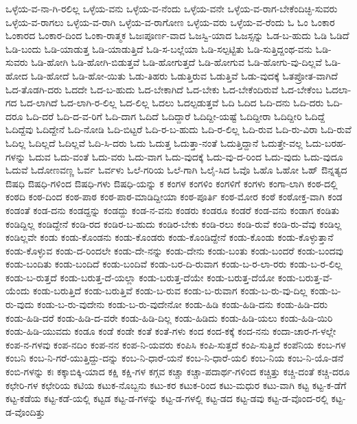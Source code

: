 {ಒಳ್ಳೆಯ-ವ-ನಾ-ಗಿ-ರಲಿಲ್ಲ
ಒಳ್ಳೆಯ-ವನು
ಒಳ್ಳೆಯ-ವ-ನೆಂದು
ಒಳ್ಳೆಯ-ವನೇ
ಒಳ್ಳೆಯ-ವ-ರಾಗ-ಬೇಕೆಂದಿಚ್ಛಿ-ಸುವರು
ಒಳ್ಳೆಯ-ವ-ರಾಗಲು
ಒಳ್ಳೆಯ-ವ-ರಾಗಿ
ಒಳ್ಳೆಯ-ವ-ರಾಗೋಣ
ಒಳ್ಳೆಯ-ವರು
ಒಳ್ಳೆಯ-ವ-ರೆಂದು
ಓ
ಓಂ
ಓಂಕಾರ
ಓಂಕಾರದ
ಓಂಕಾರ-ದಿಂದ
ಓಂಕಾ-ರಾತ್ಮಕ
ಓಜಃಪೂರ್ಣ-ವಾದ
ಓಜಸ್ವಿ-ಯಾದ
ಓಜಸ್ಸನ್ನು
ಓಡ-ಬ-ಹುದು
ಓಡಿ
ಓಡಿದೆ
ಓಡಿ-ಬಂದು
ಓಡಿ-ಯಾಡುತ್ತ
ಓಡಿ-ಯಾಡುತ್ತಿದೆ
ಓಡಿ-ಸ-ಬಲ್ಲೆಯಾ
ಓಡಿ-ಸಲ್ಪಟ್ಟಿತು
ಓಡಿ-ಸುತ್ತಿದ್ದಂಥ-ವನು
ಓಡಿ-ಸುವರು
ಓಡಿ-ಹೋಗಿ
ಓಡಿ-ಹೋಗಿ-ಬಿಡುತ್ತವೆ
ಓಡಿ-ಹೋಗುತ್ತದೆ
ಓಡಿ-ಹೋಗುವ
ಓಡಿ-ಹೋಗು-ವು-ದಿಲ್ಲವೆ
ಓಡಿ-ಹೋದ
ಓಡಿ-ಹೋದೆ
ಓಡಿ-ಹೋ-ಯಿತು
ಓಡು-ತಿಹರು
ಓಡುತ್ತಿರುವ
ಓಡುತ್ತಿವೆ
ಓಡು-ವುದಕ್ಕೆ
ಓತಪ್ರೋತ-ವಾಗಿದೆ
ಓದ-ತೊಡಗಿ-ದರು
ಓದದೇ
ಓದ-ಬ-ಹುದು
ಓದ-ಬೇಕಾಗಿದೆ
ಓದ-ಬೇಕು
ಓದ-ಬೇಕೆಂದಿರುವೆ
ಓದ-ಬೇಕೆಂಬ
ಓದಲಾ-ಗದ
ಓದ-ಲಾಗಿದೆ
ಓದ-ಲಾಗಿ-ರ-ಲಿಲ್ಲ
ಓದ-ಲಿಲ್ಲ
ಓದಲು
ಓದಲ್ಪಡುತ್ತವೆ
ಓದಿ
ಓದಿದ
ಓದಿ-ದನು
ಓದಿ-ದರು
ಓದಿ-ದರೂ
ಓದಿ-ದರೆ
ಓದಿ-ದ-ವ-ರಿಗೆ
ಓದಿ-ದಾಗ
ಓದಿದೆ
ಓದಿದ್ದಾರೆ
ಓದಿದ್ದೀ-ಯಷ್ಟೆ
ಓದಿದ್ದೀರಾ
ಓದಿದ್ದೀರಿ
ಓದಿದ್ದೆ
ಓದಿದ್ದೆವು
ಓದಿದ್ದೇನೆ
ಓದಿ-ನೋಡಿ
ಓದಿ-ಬಿಟ್ಟರೆ
ಓದಿ-ರ-ಬ-ಹುದು
ಓದಿ-ರ-ಲಿಲ್ಲ
ಓದಿ-ರುವ
ಓದಿ-ರು-ವಿರಾ
ಓದಿ-ರುವೆ
ಓದಿಲ್ಲ
ಓದಿಲ್ಲದೆ
ಓದಿಲ್ಲವೆ
ಓದಿ-ಸಿ-ದರು
ಓದು
ಓದುತ್ತ
ಓದುತ್ತಾ-ನಂತೆ
ಓದುತ್ತಿದ್ದಾನೆ
ಓದುತ್ತೇ-ವಲ್ಲ
ಓದು-ಬರಹ-ಗಳನ್ನು
ಓದುವ
ಓದು-ವಂತೆ
ಓದು-ವರು
ಓದು-ವಾಗ
ಓದು-ವುದಕ್ಕೆ
ಓದು-ವು-ದ-ರಿಂದ
ಓದು-ವುದು
ಓದು-ವುದೂ
ಓದುವೆ
ಓದೋಣವಣ್ಣ
ಓರ್ವ
ಓರ್ವಳು
ಓಲೆ-ಗರಿಯ
ಓಲೆ-ಗಾಗಿ
ಓಲೈ-ಸಿದ
ಓವೊ
ಓಹೊ
ಓಹೋ
ಓಹ್
ಔನ್ನತ್ಯದ
ಔಷಧಿ
ಔಷಧಿ-ಗಳಿಂದ
ಔಷಧಿ-ಗಳು
ಔಷಧಿ-ಯನ್ನು
ಕ
ಕಂಗಳ
ಕಂಗಳಿಂ
ಕಂಗಳಿಗೆ
ಕಂಗಳು
ಕಂಗಾ-ಲಾಗಿ
ಕಂಠ-ದಲ್ಲಿ
ಕಂಠದಿ
ಕಂಠ-ದಿಂದ
ಕಂಠ-ಪಾಠ
ಕಂಠ-ಪಾಠ-ಮಾಡಿದ್ದೀಯಾ
ಕಂಠ-ಪೂರ್ತಿ
ಕಂಠ-ಮೋರ
ಕಂಠೆ
ಕಂಠೋಕ್ತ-ವಾಗಿ
ಕಂಡ
ಕಂಡಂತೆ
ಕಂಡ-ದನು
ಕಂಡದ್ದನ್ನು
ಕಂಡದ್ದು
ಕಂಡ-ನ-ವನು
ಕಂಡರು
ಕಂಡರೂ
ಕಂಡರೆ
ಕಂಡ-ವನು
ಕಂಡಾಗ
ಕಂಡಿತು
ಕಂಡಿದ್ದಿಲ್ಲ
ಕಂಡಿದ್ದೇನೆ
ಕಂಡಿ-ರದ
ಕಂಡಿರ-ಬ-ಹುದು
ಕಂಡಿರ-ಬೇಕು
ಕಂಡಿ-ರಲು
ಕಂಡಿ-ರುವೆ
ಕಂಡಿ-ರು-ವೆವು
ಕಂಡಿಲ್ಲ
ಕಂಡಿಲ್ಲವೇ
ಕಂಡು
ಕಂಡು-ಕೊಂಡನು
ಕಂಡು-ಕೊಂಡರು
ಕಂಡು-ಕೊಂಡಿದ್ದೇನೆ
ಕಂಡು-ಕೊಂಡು
ಕಂಡು-ಕೊಳ್ಳುತ್ತಾನೆ
ಕಂಡು-ಕೊಳ್ಳುವ
ಕಂಡು-ದ-ರಿಂದಲೇ
ಕಂಡು-ದೇ-ನನ್ನು
ಕಂಡು-ದೇನು
ಕಂಡು-ಬಂತು
ಕಂಡು-ಬಂದರೆ
ಕಂಡು-ಬಂದವು
ಕಂಡು-ಬಂದಿತು
ಕಂಡು-ಬಂದಿದೆ
ಕಂಡು-ಬಂದಿವೆ
ಕಂಡು-ಬರ-ದಿ-ರುವಾಗ
ಕಂಡು-ಬ-ರ-ಲಾ-ರರು
ಕಂಡು-ಬ-ರ-ಲಿಲ್ಲ
ಕಂಡು-ಬ-ರುತ್ತದೆ
ಕಂಡು-ಬರುತ್ತ-ದೆ-ಯಲ್ಲಾ
ಕಂಡು-ಬರುತ್ತ-ದೆಯೇ
ಕಂಡು-ಬರುತ್ತ-ದೆಯೋ
ಕಂಡು-ಬರುತ್ತ-ವೆ-ಯೆಂದು
ಕಂಡು-ಬರುತ್ತಿದೆ
ಕಂಡು-ಬರುತ್ತಿವೆ
ಕಂಡು-ಬ-ರುವ
ಕಂಡು-ಬ-ರುವಾಗ
ಕಂಡು-ಬ-ರು-ವು-ದಿಲ್ಲ
ಕಂಡು-ಬ-ರು-ವುದು
ಕಂಡು-ಬ-ರು-ವುದೇನು
ಕಂಡು-ಬ-ರು-ವುದೇನೋ
ಕಂಡು-ಹಿಡಿ
ಕಂಡು-ಹಿಡಿ-ದನು
ಕಂಡು-ಹಿಡಿ-ದರು
ಕಂಡು-ಹಿಡಿ-ದರೆ
ಕಂಡು-ಹಿಡಿ-ದ-ವರೇ
ಕಂಡು-ಹಿಡಿ-ದಿಲ್ಲ
ಕಂಡು-ಹಿಡಿದು
ಕಂಡು-ಹಿಡಿ-ಯಲು
ಕಂಡು-ಹಿಡಿ-ಯಿರಿ
ಕಂಡು-ಹಿಡಿ-ಯುವದು
ಕಂಡೂ
ಕಂಡೆ
ಕಂಡೇ
ಕಂತೆ
ಕಂತೆ-ಗಳು
ಕಂದ
ಕಂದ-ಕಕ್ಕೆ
ಕಂದ-ನನು
ಕಂದಾ-ಚಾರ-ಗ-ಳಲ್ಲೇ
ಕಂಪ-ನ-ಗಳವು
ಕಂಪ-ನದಿಂ
ಕಂಪ-ನನ
ಕಂಪ-ನಿ-ಯವರು
ಕಂಪಿಸಿ
ಕಂಪಿ-ಸುತ್ತದೆ
ಕಂಪಿ-ಸುತ್ತಿದೆ
ಕಂಪೆನಿಯ
ಕಂಬ-ಗಳ
ಕಂಬನಿ
ಕಂಬ-ನಿ-ಗರೆ-ಯುತ್ತಿದ್ದು-ದನ್ನು
ಕಂಬ-ನಿ-ಧಾರೆ-ಯನೆ
ಕಂಬ-ನಿ-ಧಾರೆ-ಯಲಿ
ಕಂಬ-ನಿಯ
ಕಂಬ-ನಿ-ಯೊ-ಡನೆ
ಕಂಬಿ-ಗಳನ್ನು
ಕಃ
ಕಕ್ಕಾಬಿಕ್ಕಿ-ಯಾದ
ಕಕ್ಷಿ
ಕಕ್ಷಿ-ಗಳ
ಕಗ್ಗವ
ಕಚ್ಚಾ
ಕಚ್ಚಾ-ಪದಾರ್ಥ-ಗಳಿಂದ
ಕಚ್ಚಿತ್ತು
ಕಚ್ಚಿ-ದಂತೆ
ಕಚ್ಚಿ-ದರೂ
ಕಛೇರಿ-ಗಳ
ಕಛೇರಿಯ
ಕಟಿಯ
ಕಟುಕ-ನೊಬ್ಬನು
ಕಟು-ಕರ
ಕಟುಕ-ರಿಂದ
ಕಟು-ಮಧುರ
ಕಟು-ವಾಗಿ
ಕಟ್ಟ
ಕಟ್ಟ-ಕ-ಡೆಗೆ
ಕಟ್ಟ-ಕಡೆಯ
ಕಟ್ಟ-ಕಡೆ-ಯಲ್ಲಿ
ಕಟ್ಟಡ
ಕಟ್ಟ-ಡ-ಗಳನ್ನು
ಕಟ್ಟ-ಡ-ಗಳಲ್ಲಿ
ಕಟ್ಟ-ಡದ
ಕಟ್ಟ-ಡವು
ಕಟ್ಟ-ಡ-ವೊಂದ-ರಲ್ಲಿ
ಕಟ್ಟ-ಡ-ವೊಂದಿತ್ತು
}

